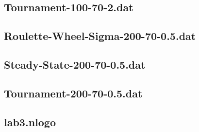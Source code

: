 \documentclass[titlepage, a4paper, 12pt]{article}
\begin{document}
\subsection{Tournament-100-70-2.dat}\label{Tournament-100-70-2.dat}
\begin{footnotesize}
  
\end{footnotesize}

\subsection{Roulette-Wheel-Sigma-200-70-0.5.dat}\label{Roulette-Wheel-Sigma-200-70-0.5.dat}
\begin{footnotesize}
  
\end{footnotesize}

\subsection{Steady-State-200-70-0.5.dat}\label{Steady-State-200-70-0.5.dat}
\begin{footnotesize}
  
\end{footnotesize}

\subsection{Tournament-200-70-0.5.dat}\label{Tournament-200-70-0.5.dat}
\begin{footnotesize}
  
\end{footnotesize}

\subsection{lab3.nlogo}\label{app:lab3.nlogo}
\begin{footnotesize}
  
\end{footnotesize}
\end{document}
